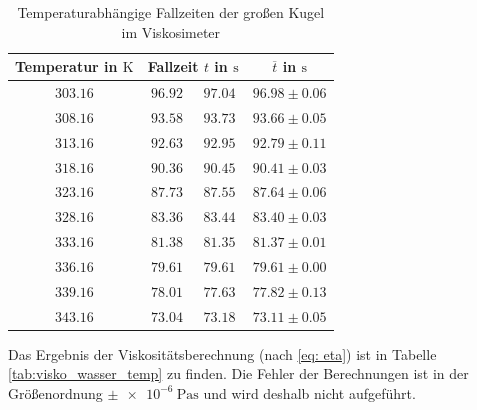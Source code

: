 \begin{table}
\centering
\begin{tabular} {cccc}
  \toprule
  Temperatur in $\si{\kelvin}$ & \multicolumn{2}{c}{Fallzeit $t$ in $\si{\second}$} & $\overline{t}$ in $\si{\second}$ \\
  \midrule
  $\num{303.16}$ & $\num{96.92}$  & $\num{97.04}$ & $\num{96.98}\pm\num{0.06}$ \\
  $\num{308.16}$ & $\num{93.58}$  & $\num{93.73}$ & $\num{93.66}\pm\num{0.05}$ \\
  $\num{313.16}$ & $\num{92.63}$ & $\num{92.95}$   & $\num{92.79}\pm\num{0.11}$ \\
  $\num{318.16}$ & $\num{90.36}$ & $\num{90.45}$ &  $\num{90.41}\pm\num{0.03}$ \\
  $\num{323.16}$ & $\num{87.73}$ & $\num{87.55}$ & $\num{87.64}\pm\num{0.06}$ \\
  $\num{328.16}$ & $\num{83.36}$ & $\num{83.44}$ & $\num{83.40}\pm\num{0.03}$ \\
  $\num{333.16}$ & $\num{81.38}$ & $\num{81.35}$ & $\num{81.37}\pm\num{0.01}$ \\
  $\num{336.16}$ & $\num{79.61}$ & $\num{79.61}$ & $\num{79.61}\pm\num{0.00}$ \\
  $\num{339.16}$ & $\num{78.01}$ &  $\num{77.63}$ & $\num{77.82}\pm\num{0.13}$ \\
  $\num{343.16}$ & $\num{73.04}$ & $\num{73.18}$ & $\num{73.11}\pm\num{0.05}$ \\
\bottomrule
\end{tabular}
\caption{Temperaturabhängige Fallzeiten der großen Kugel im Viskosimeter} %
\label{tab:messwerte_fallzeit_kugel_gross_temo}
\end{table}

Das Ergebnis der Viskositätsberechnung (nach \eqref{eq: eta}) ist in Tabelle \ref{tab:visko_wasser_temp} zu finden. %
Die Fehler der Berechnungen ist in der Größenordnung $\pm \SI{e-6}{\pascal\second}$ und 
wird deshalb nicht aufgeführt.

